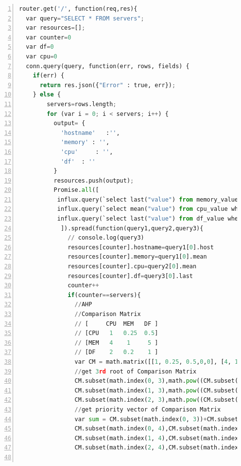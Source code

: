 \begin{lstlisting}[numbers=left, frame=single,tabsize=2,breaklines,caption={Kode sumber Model Auth},label=modelAuth, language=python]
router.get('/', function(req,res){
  var query="SELECT * FROM servers";
  var resources=[];
  var counter=0
  var df=0
  var cpu=0
  conn.query(query, function(err, rows, fields) {
    if(err) {
      return res.json({"Error" : true, err});
    } else {
        servers=rows.length;
        for (var i = 0; i < servers; i++) {
          output= {
            'hostname'   :'',
            'memory' : '',
            'cpu'     : '',
            'df'  : ''
          }
          resources.push(output);          
          Promise.all([
           influx.query(`select last("value") from memory_value where type='percent' and type_instance='free' and time > now() - 24h and host=${Influx.escape.stringLit(rows[i].hostname)} group by host`),
           influx.query(`select mean("value") from cpu_value where type='percent' and type_instance='idle' and time > now() - 24h and host=${Influx.escape.stringLit(rows[i].hostname)} group by host`),
           influx.query(`select last("value") from df_value where type='percent_bytes' and type_instance='free' and time > now() - 24h and host=${Influx.escape.stringLit(rows[i].hostname)} group by host`) 
            ]).spread(function(query1,query2,query3){
              // console.log(query3)
              resources[counter].hostname=query1[0].host
              resources[counter].memory=query1[0].mean
              resources[counter].cpu=query2[0].mean             
              resources[counter].df=query3[0].last
              counter++
              if(counter==servers){
                //AHP
                //Comparison Matrix
                // [     CPU  MEM   DF ]
                // [CPU   1   0.25  0.5]
                // [MEM   4    1     5 ]
                // [DF    2   0.2    1 ]
                var CM = math.matrix([[1, 0.25, 0.5,0,0], [4, 1, 5,0,0], [2, 0.2, 1,0,0]]); 
                //get 3rd root of Comparison Matrix
                CM.subset(math.index(0, 3),math.pow((CM.subset(math.index(0, 0))*CM.subset(math.index(0, 1))*CM.subset(math.index(0, 2))), 1/3));
                CM.subset(math.index(1, 3),math.pow((CM.subset(math.index(1, 0))*CM.subset(math.index(1, 1))*CM.subset(math.index(1, 2))), 1/3));
                CM.subset(math.index(2, 3),math.pow((CM.subset(math.index(2, 0))*CM.subset(math.index(2, 1))*CM.subset(math.index(2, 2))), 1/3));
                //get priority vector of Comparison Matrix
                var sum = CM.subset(math.index(0, 3))+CM.subset(math.index(1, 3))+CM.subset(math.index(2, 3));  
                CM.subset(math.index(0, 4),CM.subset(math.index(0, 3)) / sum)
                CM.subset(math.index(1, 4),CM.subset(math.index(1, 3)) / sum)
                CM.subset(math.index(2, 4),CM.subset(math.index(2, 3)) / sum)                
                

\end{lstlisting}
